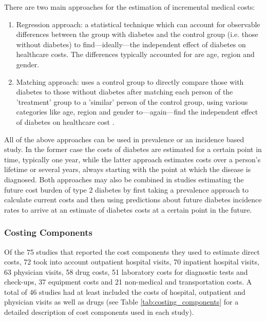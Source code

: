 \documentclass[12pt,english]{article}
\begin{document}
{{\begin{small}
\begin{enumerate}
There are two main approaches for the estimation of incremental medical costs:
\begin{enumerate}

\item Regression approach: a statistical technique which can account for observable differences between the group with diabetes and the control group (i.e. those without diabetes) to find---ideally---the independent effect of diabetes on healthcare costs. The differences typically accounted for are age, region and gender.

\item Matching approach: uses a control group to directly compare those with diabetes to those without diabetes after matching each person of the 'treatment' group to a 'similar' person of the control group, using various categories like age, region and gender to---again---find the independent effect of diabetes on healthcare cost \parencite{Akobundu2006}.
\end{enumerate}
\end{enumerate}

All of the above approaches can be used in prevalence or an incidence based study. In the former case the costs of diabetes are estimated for a certain point in time, typically one year, while the latter approach estimates costs over a person's lifetime or several years, always starting with the point at which the disease is diagnosed. Both approaches may also be combined in studies estimating the future cost burden of type 2 diabetes by first taking a prevalence approach to calculate current costs and then using predictions about future diabetes incidence rates to arrive at an estimate of diabetes costs at a certain point in the future.\end{small}
}}

\subsubsection{Costing Components}
Of the 75 studies that reported the cost components they used to estimate direct costs, 72 took into account outpatient hospital visits, 70 inpatient hospital visits, 63 physician visits, 58 drug costs, 51 laboratory costs for diagnostic tests and check-ups, 37 equipment costs and 21 non-medical and transportation costs. A total of 46 studies had at least included the costs of hospital, outpatient and physician visits as well as drugs (see Table \ref{tab:costing_components} for a detailed description of cost components used in each study).
\end{document}
